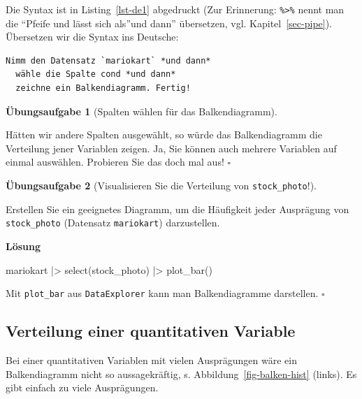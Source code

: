 \documentclass[
  letterpaper,
  twoside,
  open=any]{scrbook}
\newenvironment{Shaded}{\begin{snugshade}}{\end{snugshade}}
\newcommand{\FunctionTok}[1]{\textcolor[rgb]{0.28,0.35,0.67}{#1}}
\newcommand{\NormalTok}[1]{\textcolor[rgb]{0.00,0.23,0.31}{#1}}
\newcommand{\SpecialCharTok}[1]{\textcolor[rgb]{0.37,0.37,0.37}{#1}}
\theoremstyle{definition}
\newtheorem{exercise}{Übungsaufgabe}[chapter]
\theoremstyle{definition}
\theoremstyle{definition}
\theoremstyle{remark}
\begin{document}
Die Syntax ist in Listing~\ref{lst-de1} abgedruckt (Zur Erinnerung:
\texttt{\%\textgreater{}\%} nennt man die \enquote{Pfeife und lässt sich
als}und dann'' übersetzen, vgl. Kapitel~\ref{sec-pipe}). Übersetzen wir
die Syntax ins Deutsche:

\begin{verbatim}
Nimm den Datensatz `mariokart` *und dann*
  wähle die Spalte cond *und dann*
  zeichne ein Balkendiagramm. Fertig!
\end{verbatim}

\begin{exercise}[Spalten wählen für das
Balkendiagramm]\protect\hypertarget{exr-de1}{}\label{exr-de1}

Hätten wir andere Spalten ausgewählt, so würde das Balkendiagramm die
Verteilung jener Variablen zeigen. Ja, Sie können auch mehrere Variablen
auf einmal auswählen. Probieren Sie das doch mal aus! \(\square\)

\end{exercise}

\begin{exercise}[Visualisieren Sie die Verteilung von
\texttt{stock\_photo}!]\protect\hypertarget{exr-balken}{}\label{exr-balken}

Erstellen Sie ein geeignetes Diagramm, um die Häufigkeit jeder
Ausprägung von \texttt{stock\_photo} (Datensatz \texttt{mariokart})
darzustellen.

\textbf{Lösung}

\begin{Shaded}
\begin{Highlighting}[]
\NormalTok{mariokart }\SpecialCharTok{|\textgreater{}} 
  \FunctionTok{select}\NormalTok{(stock\_photo) }\SpecialCharTok{|\textgreater{}} 
  \FunctionTok{plot\_bar}\NormalTok{()}
\end{Highlighting}
\end{Shaded}

Mit \texttt{plot\_bar} aus \texttt{DataExplorer} kann man
Balkendiagramme darstellen. \(\square\)

\end{exercise}

\subsection{Verteilung einer quantitativen
Variable}\label{verteilung-einer-quantitativen-variable}

Bei einer quantitativen Variablen mit vielen Ausprägungen wäre ein
Balkendiagramm nicht so aussagekräftig, s.
Abbildung~\ref{fig-balken-hist} (links). Es gibt einfach zu viele
Ausprägungen.
\end{document}
